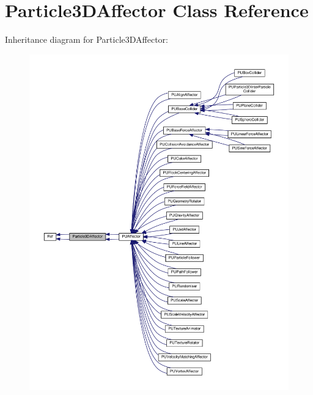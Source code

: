 \hypertarget{classParticle3DAffector}{}\section{Particle3\+D\+Affector Class Reference}
\label{classParticle3DAffector}


Inheritance diagram for Particle3\+D\+Affector\+:
\nopagebreak
\begin{figure}[H]
\begin{center}
\leavevmode
\includegraphics[width=350pt]{classParticle3DAffector__inherit__graph}
\end{center}
\end{figure}


